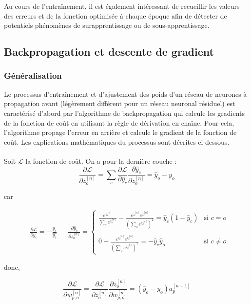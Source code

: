 \documentclass[12pt,english, openany]{book}
\begin{document}
Au cours de l'entraînement, il est également intéressant de recueillir les valeurs des erreurs et de la fonction optimisée à chaque époque afin de détecter de potentiels phénomènes de surapprentissage ou de sous-apprentissage.

\subsection{Backpropagation et descente de gradient}
\label{subsec:backprop}
\subsubsection{Généralisation}
Le processus d'entraînement et d'ajustement des poids d'un réseau de neurones à propagation avant (légèrement différent pour un réseau neuronal résiduel) est caractérisé d'abord par l'algorithme de backpropagation qui calcule les gradients de la fonction de coût en utilisant la règle de dérivation en chaîne. Pour cela, l'algorithme propage l'erreur en arrière et calcule le gradient de la fonction de coût. Les explications mathématiques du processus sont décrites ci-dessous.\\\\
Soit $\mathcal{L}$ la fonction de coût.
On a pour la dernière couche :
$$
    \frac{\partial{\mathcal{L}}}{\partial{z_{o}^{[n]}}} = \sum_c \frac{\partial{\mathcal{L}}}{\partial\hat{y}_c}\frac{\partial\hat{y}_c}{\partial{z_{o}^{[n]}}} = \hat{y}_o - y_o
$$
\begin{tabbing}
\hspace{2cm}
car 
\end{tabbing}
\begin{align*}
&\frac{\partial{\mathcal{L}}}{\partial\hat{y}_c} = - \frac{y_c}{\hat{y_c}}
&&\frac{\partial\hat{y}_c}{\partial{z_{o}^{[n]}}} = \left\{
\begin{array}{cc}
     \frac{e^{z_{c}^{[n]}}}{\sum_{o}^{}e^{z_{o}^{[n]}}} - \frac{e^{z_{c}^{[n]}}e^{z_{c}^{[n]}}}{(\sum_{o}^{}e^{z_{o}^{[n]}})^2} =  \hat{y}_c(1- \hat{y}_c) & \mbox{si } c = o  \\\\
     0 - \frac{e^{z_{c}^{[n]}}e^{z_{c}^{[n]}}}{(\sum_{o}^{}e^{z_{o}^{[n]}})^2} = - \hat{y}_c\hat{y}_o & \mbox{si } c \neq o
\end{array}
\right.
\end{align*}
\begin{tabbing}
\hspace{2cm}
donc,

\end{tabbing}
$$
\frac{\partial{\mathcal{L}}}{\partial w^{[n]}_{p,o}} = \frac{\partial{\mathcal{L}}}{\partial{z_{o}^{[n]}}}\frac{\partial{z_{o}^{[n]}}}{\partial w^{[n]}_{p,o}} = (\hat{y}_o - y_o)a_p^{[n-1]}
$$
\end{document}
